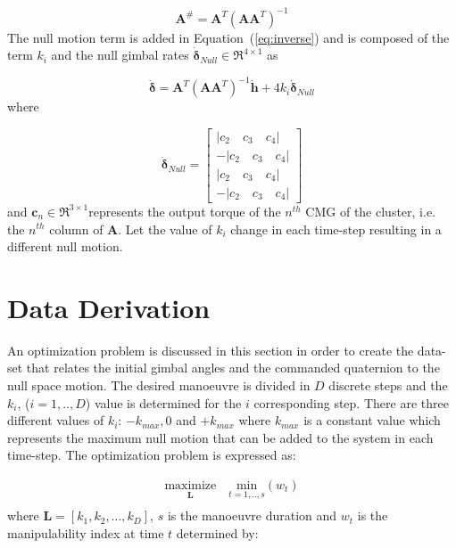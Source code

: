 \documentclass[aerospace,article,submit,moreauthors,dvi2pdf]{Definitions/mdpi}
\begin{document}
\begin{equation}
\textbf{A}^\#=\textbf{A}^T(\textbf{A}\textbf{A}^T)^{-1}
\label{eq:SR_inverse}
\end{equation}
The null motion term is added in Equation~(\ref{eq:inverse}) and is composed of the term $k_i$ and the null gimbal rates $\dot{\boldsymbol{\delta}}_{Null}\in\Re^{4\times1}$ as

\begin{equation}
\label{eq:nullk}
   \dot{\boldsymbol{\delta}}=\textbf{A}^T(\textbf{A}\textbf{A}^T)^{-1} \dot{ \textbf{h}} + 4k_i \dot{\boldsymbol{\delta}}_{Null}
\end{equation}
where

\begin{equation}
\label{eq:nulldelta}
 \dot{\boldsymbol{\delta}}_{Null}=
\begin{bmatrix}
|c_2 \quad c_3 \quad c_4|\\ 
-|c_2 \quad c_3 \quad c_4|\\
|c_2 \quad c_3  \quad c_4|\\
-|c_2  \quad c_3 \quad c_4|
\end{bmatrix}
\end{equation}
and $\textbf{c}_n\in \Re^{3\times1}$represents the output torque of the $n^{th}$ CMG of the cluster, i.e. the $n^{th}$ column of $\textbf{A}$. Let the value of $k_i$ change in each time-step resulting in a different null motion.
 
 
 \section{Data Derivation}

An optimization problem is discussed in this section in order to create the data-set that relates the initial gimbal angles and the commanded quaternion to the null space motion. The desired manoeuvre is divided in $D$ discrete steps and the $k_i$, ($i=1,..,D$) value is determined for the $i$ corresponding step. There are three different values of $k_i$:  $-k_{max}, 0$ and $ +k_{max}$ where $k_{max}$ is a constant value which represents the maximum null motion that can be added to the system in each time-step.
The optimization problem is expressed as:

\begin{equation}
\begin{aligned}
\underset{\textbf{L}}{\text{maximize}} \quad
 \underset{t=1,..,s}{\text{min}}(w_t) \\
\end{aligned}
\label{eq:optimizationproblem}
\end{equation}
where $\textbf{L}=[k_1, k_2, ... , k_D]$, $s$ is the manoeuvre duration and $w_t$ is the manipulability index at time $t$ determined by:
\end{document}
